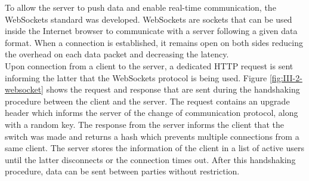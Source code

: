       To allow the server to push data and enable real-time communication, the WebSockets standard was developed. WebSockets are sockets that can be used inside the Internet browser to communicate with a server following a given data format. When a connection is established, it remains open on both sides reducing the overhead on each data packet and decreasing the latency. \\

      Upon connection from a client to the server, a dedicated HTTP request is sent informing the latter that the WebSockets protocol is being used. Figure \ref{fig:III-2-websocket} shows the request and response that are sent during the handshaking procedure between the client and the server. The request contains an upgrade header which informs the server of the change of communication protocol, along with a random key. The response from the server informs the client that the switch was made and returns a hash which prevents multiple connections from a same client. The server stores the information of the client in a list of active users until the latter disconnects or the connection times out. After this handshaking procedure, data can be sent between parties without restriction.

